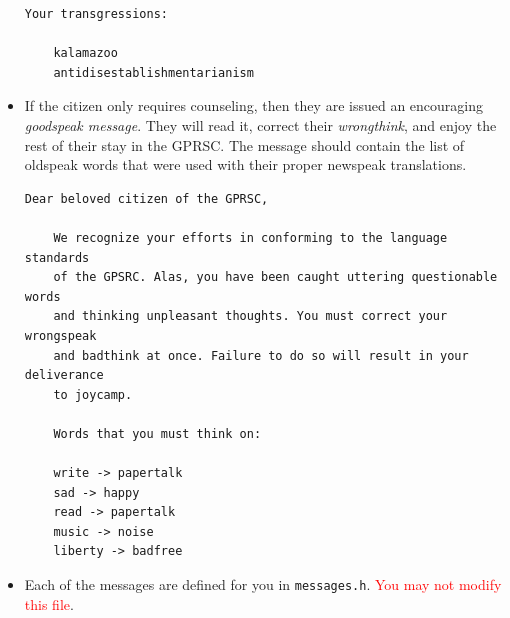 \documentclass{article}
\begin{document}
\begin{itemize}
\begin{lstlisting}[style=plainstyle]
    Your transgressions:

    kalamazoo
    antidisestablishmentarianism\end{lstlisting}

  \item If the citizen only requires counseling, then they are issued an
    encouraging \emph{goodspeak message}. They will read it, correct
    their \emph{wrongthink}, and enjoy the rest of their stay in the
    GPRSC. The message should contain the list of oldspeak words that
    were used with their proper newspeak translations.

    \begin{lstlisting}[style=plainstyle]
    Dear beloved citizen of the GPRSC,

    We recognize your efforts in conforming to the language standards
    of the GPSRC. Alas, you have been caught uttering questionable words
    and thinking unpleasant thoughts. You must correct your wrongspeak
    and badthink at once. Failure to do so will result in your deliverance
    to joycamp.

    Words that you must think on:

    write -> papertalk
    sad -> happy
    read -> papertalk
    music -> noise
    liberty -> badfree\end{lstlisting}

  \item Each of the messages are defined for you in \texttt{messages.h}.
    \textcolor{red}{You may not modify this file}.


\end{itemize}
\end{document}
